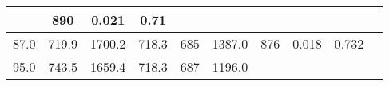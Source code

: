 \documentclass[a4paper,10pt]{article}
\begin{document}
\begin{longtable}{
     |
%    
    c|
%    
    c|
%    
    c|
%    
    c|
%    
    c|
%    
    c|
%    
    c|
%    
    c|
%    
    c|
%    
    c|
%    
    }
%        
        & 890
%        

%        

%        
        & 0.021
%        

%        

%        
        & 0.71
%        

%        
        \\
        \hline

        

%        

%        
        87.0
%        

%        

%        
        & 719.9
%        

%        

%        
        & 1700.2
%        

%        

%        
        & 718.3
%        

%        

%        
        & 685
%        

%        

%        
        & 1387.0
%        

%        

%        
        & 876
%        

%        

%        
        & 0.018
%        

%        

%        
        & 0.732
%        

%        
        \\
        \hline

        

%        

%        
        95.0
%        

%        

%        
        & 743.5
%        

%        

%        
        & 1659.4
%        

%        

%        
        & 718.3
%        

%        

%        
        & 687
%        

%        

%        
        & 1196.0
%        

%        


\end{longtable}
\end{document}
